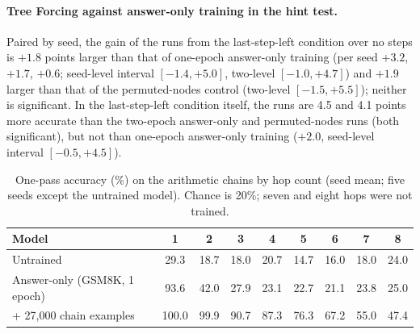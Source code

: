 \paragraph{Tree Forcing against answer-only training in the hint test.} Paired by seed, the gain of the \tf{} runs
from the last-step-left condition over no steps is $+1.8$ points larger than that of one-epoch answer-only training
(per seed $+3.2$, $+1.7$, $+0.6$; seed-level interval $[-1.4, +5.0]$, two-level $[-1.0, +4.7]$) and $+1.9$ larger than
that of the permuted-nodes control (two-level $[-1.5, +5.5]$); neither is significant. In the last-step-left condition
itself, the \tf{} runs are 4.5 and 4.1 points more accurate than the two-epoch answer-only and permuted-nodes runs
(both significant), but not than one-epoch answer-only training ($+2.0$, seed-level interval $[-0.5, +4.5]$).

\begin{table}[h]
\centering
\small
\caption{One-pass accuracy (\%) on the arithmetic chains by hop count (seed mean; five seeds except the untrained
model). Chance is 20\%; seven and eight hops were not trained.}
\label{tab:khop}
\begin{tabular}{lcccccccc}
\toprule
Model & 1 & 2 & 3 & 4 & 5 & 6 & 7 & 8 \\
\midrule
Untrained & 29.3 & 18.7 & 18.0 & 20.7 & 14.7 & 16.0 & 18.0 & 24.0 \\
Answer-only (GSM8K, 1 epoch) & 93.6 & 42.0 & 27.9 & 23.1 & 22.7 & 21.1 & 23.8 & 25.0 \\
+ 27,000 chain examples & 100.0 & 99.9 & 90.7 & 87.3 & 76.3 & 67.2 & 55.0 & 47.4 \\
\bottomrule
\end{tabular}
\end{table}
